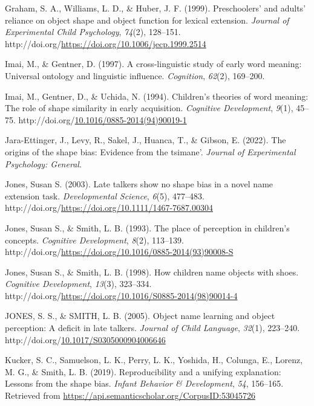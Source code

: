 \documentclass[10pt, letterpaper]{article}
\newenvironment{CSLReferences}%
  {}%
  {\par}
\begin{document}
\begin{CSLReferences}{1}{0}
\leavevmode{}%
Graham, S. A., Williams, L. D., \& Huber, J. F. (1999). Preschoolers'
and adults' reliance on object shape and object function for lexical
extension. \emph{Journal of Experimental Child Psychology},
\emph{74}(2), 128--151.
http://doi.org/\url{https://doi.org/10.1006/jecp.1999.2514}

\leavevmode{}%
Imai, M., \& Gentner, D. (1997). A cross-linguistic study of early word
meaning: Universal ontology and linguistic influence. \emph{Cognition},
\emph{62}(2), 169--200.

\leavevmode{}%
Imai, M., Gentner, D., \& Uchida, N. (1994). Children's theories of word
meaning: {The} role of shape similarity in early acquisition.
\emph{Cognitive Development}, \emph{9}(1), 45--75.
http://doi.org/\href{https://doi.org/10.1016/0885-2014(94)90019-1}{10.1016/0885-2014(94)90019-1}

\leavevmode{}%
Jara-Ettinger, J., Levy, R., Sakel, J., Huanca, T., \& Gibson, E.
(2022). The origins of the shape bias: Evidence from the tsimane'.
\emph{Journal of Experimental Psychology: General}.

\leavevmode{}%
Jones, Susan S. (2003). Late talkers show no shape bias in a novel name
extension task. \emph{Developmental Science}, \emph{6}(5), 477--483.
http://doi.org/\url{https://doi.org/10.1111/1467-7687.00304}

\leavevmode{}%
Jones, Susan S., \& Smith, L. B. (1993). The place of perception in
children's concepts. \emph{Cognitive Development}, \emph{8}(2),
113--139.
http://doi.org/\url{https://doi.org/10.1016/0885-2014(93)90008-S}

\leavevmode{}%
Jones, Susan S., \& Smith, L. B. (1998). How children name objects with
shoes. \emph{Cognitive Development}, \emph{13}(3), 323--334.
http://doi.org/\url{https://doi.org/10.1016/S0885-2014(98)90014-4}

\leavevmode{}%
JONES, S. S., \& SMITH, L. B. (2005). Object name learning and object
perception: A deficit in late talkers. \emph{Journal of Child Language},
\emph{32}(1), 223--240.
http://doi.org/\href{https://doi.org/10.1017/S0305000904006646}{10.1017/S0305000904006646}

\leavevmode{}%
Kucker, S. C., Samuelson, L. K., Perry, L. K., Yoshida, H., Colunga, E.,
Lorenz, M. G., \& Smith, L. B. (2019). Reproducibility and a unifying
explanation: Lessons from the shape bias. \emph{Infant Behavior \&
Development}, \emph{54}, 156--165. Retrieved from
\url{https://api.semanticscholar.org/CorpusID:53045726}


\end{CSLReferences}
\end{document}

